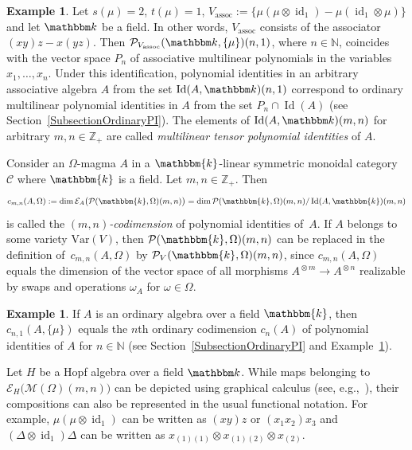 \documentclass[12pt, reqno, a4paper]{amsart}
\theoremstyle{plain}
\theoremstyle{remark}
\theoremstyle{definition}
\newtheorem{example}[theorem]{Example}
\numberwithin{equation}{section}
\DeclareMathOperator{\Id}{Id}
\DeclareMathOperator{\id}{id}
\begin{document}
 \begin{example}\label{ExampleAssocAlgebra}
 	Let $s(\mu)=2$, $t(\mu)=1$, $V_\mathrm{assoc} := \lbrace \mu(\mu \otimes \id_1) -  \mu( \id_1 \otimes \mu )\rbrace$ and let $\mathbbm k$ be a field.
 	In other words, $V_\mathrm{assoc}$ consists of the associator $(xy)z-x(yz)$. Then $\mathcal P_{V_\mathrm{assoc}}(\mathbbm k, \lbrace \mu \rbrace)(n,1)$, where $n\in\mathbb N$, coincides with the vector space $P_n$ of associative multilinear polynomials in the variables $x_1, \ldots, x_n$. Under this identification,
 	polynomial identities in an arbitrary associative algebra $A$ from
 	the set $\Id(A, \mathbbm k)(n,1)$ correspond to ordinary multilinear polynomial identities in $A$
 	from the set $P_n \cap \Id(A)$
 	 (see Section~\ref{SubsectionOrdinaryPI}). The elements of $\Id(A, \mathbbm k)(m,n)$ for arbitrary $m,n\in\mathbb Z_+$
 	 are called \textit{multilinear tensor polynomial identities} of $A$.
 \end{example}	

 Consider an $\Omega$-magma $A$ in a $\mathbbm{k}$-linear symmetric monoidal category $\mathcal C$
 where $\mathbbm{k}$ is a field.  Let $m,n \in \mathbb{Z}_+$.  Then
  $$c_{m,n}(A, \Omega) := \dim \mathcal E_A\bigl(\mathcal P(\mathbbm{k}, \Omega)(m, n) \bigr)
  = \dim \mathcal P(\mathbbm{k}, \Omega)(m, n)/\Id(A, \mathbbm{k})(m, n)
  $$ is called the \textit{$(m,n)$-codimension} of polynomial identities of~$A$.
  If $A$ belongs to some variety $\mathrm{Var}(V)$, then $\mathcal P(\mathbbm{k}, \Omega)(m, n)$
  can be replaced in the definition of~$c_{m,n}(A, \Omega)$ by $\mathcal P_V (\mathbbm{k}, \Omega)(m, n)$, since
  $c_{m,n}(A, \Omega)$ equals the dimension of the vector space of all morphisms $A^{{}\otimes m} \to A^{{}\otimes n}$
realizable by swaps and operations $\omega_A$ for $\omega \in \Omega$.

 
 \begin{example} If $A$ is an ordinary algebra over a field $\mathbbm{k}$, then $c_{n,1}(A, \lbrace \mu \rbrace)$ equals the $n$th ordinary codimension $c_n(A)$ of polynomial identities of $A$ for $n\in \mathbb N$ (see Section~\ref{SubsectionOrdinaryPI} and Example~\ref{ExampleAssocAlgebra}).
 \end{example}	

	Let $H$ be a Hopf algebra over a field $\mathbbm k$.
While maps belonging to 
$\mathcal E_H\bigl(\mathcal M(\Omega)(m, n) \bigr)$ can be depicted using graphical calculus (see,  e.g.,~\cite{KasselQuantumGroups}), their compositions can also be represented in the usual functional notation.
For example, $\mu(\mu \otimes \id_1)$ can be written as $(xy)z$ or $(x_1 x_2)x_3$ and 
$(\Delta \otimes \id_1)\Delta$ can be written as $x_{(1)(1)}\otimes x_{(1)(2)}\otimes x_{(2)}$.
 
\end{document}
